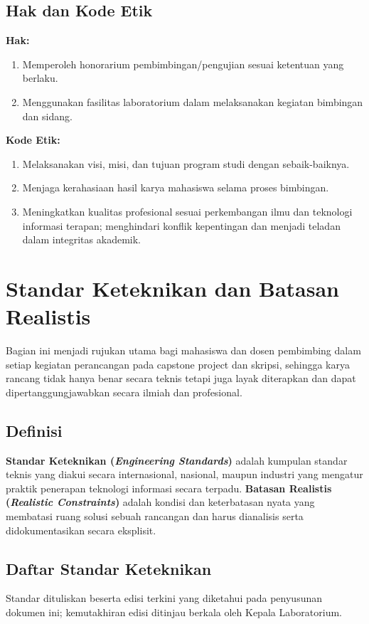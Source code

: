 \documentclass[12pt,a4paper]{report}
\begin{document}
\section{Hak dan Kode Etik}
\textbf{Hak:}
\begin{enumerate}
\item Memperoleh honorarium pembimbingan/pengujian sesuai ketentuan yang berlaku.
\item Menggunakan fasilitas laboratorium dalam melaksanakan kegiatan bimbingan dan sidang.
\end{enumerate}
\textbf{Kode Etik:}
\begin{enumerate}
\item Melaksanakan visi, misi, dan tujuan program studi dengan sebaik-baiknya.
\item Menjaga kerahasiaan hasil karya mahasiswa selama proses bimbingan.
\item Meningkatkan kualitas profesional sesuai perkembangan ilmu dan teknologi informasi terapan; menghindari konflik kepentingan dan menjadi teladan dalam integritas akademik.
\end{enumerate}

\chapter{Standar Keteknikan dan Batasan Realistis}
\label{chap:standar}

Bagian ini menjadi rujukan utama bagi mahasiswa dan dosen pembimbing dalam setiap kegiatan perancangan pada capstone project dan skripsi, sehingga karya rancang tidak hanya benar secara teknis tetapi juga layak diterapkan dan dapat dipertanggungjawabkan secara ilmiah dan profesional.

\section{Definisi}
\textbf{Standar Keteknikan (\emph{Engineering Standards})} adalah kumpulan standar teknis yang diakui secara internasional, nasional, maupun industri yang mengatur praktik penerapan teknologi informasi secara terpadu. \textbf{Batasan Realistis (\emph{Realistic Constraints})} adalah kondisi dan keterbatasan nyata yang membatasi ruang solusi sebuah rancangan dan harus dianalisis serta didokumentasikan secara eksplisit.

\section{Daftar Standar Keteknikan}
Standar dituliskan beserta edisi terkini yang diketahui pada penyusunan dokumen ini; kemutakhiran edisi ditinjau berkala oleh Kepala Laboratorium.
\end{document}
